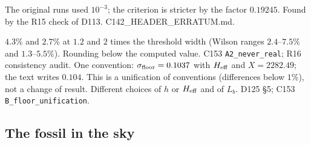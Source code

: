 \begin{description}
{The original runs used $10^{-3}$; the criterion is stricter by the factor $0.19245$.}
{Found by the R15 check of D113.}
{C142\_HEADER\_ERRATUM.md.}

{$4.3\%$ and $2.7\%$ at $1.2$ and $2$ times the threshold width (Wilson ranges $2.4$--$7.5\%$ and $1.3$--$5.5\%$).}
{Rounding below the computed value.}
{C153 \texttt{A2\_never\_real}; R16 consistency audit.}
{One convention: $\sigma_{\mathrm{floor}}=0.1037$ with $H_{\rm eff}$ and $X=2282.49$; the text writes $0.104$. This is a unification of conventions (differences below $1\%$), not a change of result.}
{Different choices of $h$ or $H_{\rm eff}$ and of $L_b$.}
{D125 \S5; C153 \texttt{B\_floor\_unification}.}
\end{description}

\subsection{The fossil in the sky}\label{sec:v23-sky}

